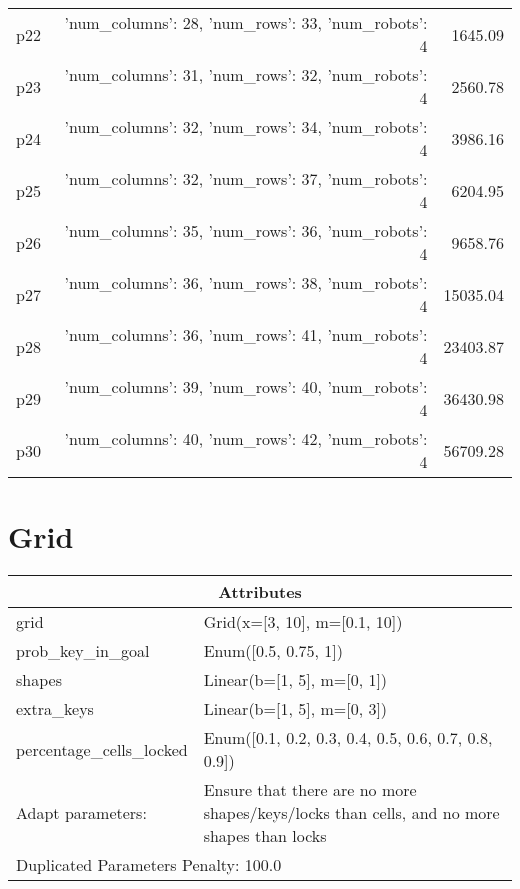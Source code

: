 \documentclass{article}
\begin{document}
\begin{center}
\begin{tabular}{@{}l|r|r@{}}
  p22&{'num\_columns': 28, 'num\_rows': 33, 'num\_robots': 4}&1645.09\\
  p23&{'num\_columns': 31, 'num\_rows': 32, 'num\_robots': 4}&2560.78\\
  p24&{'num\_columns': 32, 'num\_rows': 34, 'num\_robots': 4}&3986.16\\
  p25&{'num\_columns': 32, 'num\_rows': 37, 'num\_robots': 4}&6204.95\\
  p26&{'num\_columns': 35, 'num\_rows': 36, 'num\_robots': 4}&9658.76\\
  p27&{'num\_columns': 36, 'num\_rows': 38, 'num\_robots': 4}&15035.04\\
  p28&{'num\_columns': 36, 'num\_rows': 41, 'num\_robots': 4}&23403.87\\
  p29&{'num\_columns': 39, 'num\_rows': 40, 'num\_robots': 4}&36430.98\\
  p30&{'num\_columns': 40, 'num\_rows': 42, 'num\_robots': 4}&56709.28
                            \end{tabular}
                            \end{center}
                    
                            \newpage \section{Grid}
                    \begin{center}
                    \begin{tabular}{@{}p{}p{}@{}}
                    \multicolumn{2}{c}{\bf \large Attributes}\\\midrule
                    grid & Grid(x=[3, 10], m=[0.1, 10])\\
prob\_key\_in\_goal & Enum([0.5, 0.75, 1])\\
shapes & Linear(b=[1, 5], m=[0, 1])\\
extra\_keys & Linear(b=[1, 5], m=[0, 3])\\
percentage\_cells\_locked & Enum([0.1, 0.2, 0.3, 0.4, 0.5, 0.6, 0.7, 0.8, 0.9])
                    \\\midrule
                    Adapt parameters: & Ensure that there are no more shapes/keys/locks than cells, and no more shapes than locks \\\midrule
                    \multicolumn{2}{l}{Duplicated Parameters Penalty: 100.0}
                    \end{tabular}
                    \end{center}
                
\end{document}
